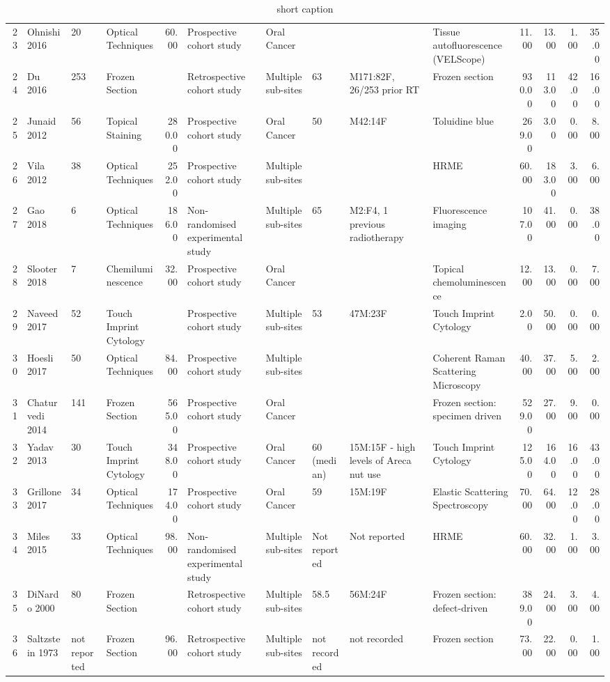 \begin{table}[ht]
\begin{tabular}{rlllrlllllrrrr}
  23 & Ohnishi 2016 & 20 & Optical Techniques & 60.00 & Prospective cohort study & Oral Cancer &  &  & Tissue autofluorescence (VELScope) & 11.00 & 13.00 & 1.00 & 35.00 \\ 
  24 & Du 2016 & 253 & Frozen Section &  & Retrospective cohort study & Multiple sub-sites & 63 & M171:82F, 26/253 prior RT & Frozen section & 930.00 & 113.00 & 42.00 & 16.00 \\ 
  25 & Junaid 2012 & 56 & Topical Staining & 280.00 & Prospective cohort study & Oral Cancer & 50 & M42:14F & Toluidine blue & 269.00 & 3.00 & 0.00 & 8.00 \\ 
  26 & Vila 2012 & 38 & Optical Techniques & 252.00 & Prospective cohort study & Multiple sub-sites &  &  & HRME & 60.00 & 183.00 & 3.00 & 6.00 \\ 
  27 & Gao 2018 & 6 & Optical Techniques & 186.00 & Non-randomised experimental study & Multiple sub-sites & 65 & M2:F4, 1 previous radiotherapy & Fluorescence imaging & 107.00 & 41.00 & 0.00 & 38.00 \\ 
  28 & Slooter 2018 & 7 & Chemiluminescence & 32.00 & Prospective cohort study & Oral Cancer &  &  & Topical chemoluminescence & 12.00 & 13.00 & 0.00 & 7.00 \\ 
  29 & Naveed 2017 & 52 & Touch Imprint Cytology &  & Prospective cohort study & Multiple sub-sites & 53 & 47M:23F & Touch Imprint Cytology & 2.00 & 50.00 & 0.00 & 0.00 \\ 
  30 & Hoesli 2017 & 50 & Optical Techniques & 84.00 & Prospective cohort study & Multiple sub-sites &  &  & Coherent Raman Scattering Microscopy & 40.00 & 37.00 & 5.00 & 2.00 \\ 
  31 & Chaturvedi 2014 & 141 & Frozen Section & 565.00 & Prospective cohort study & Oral Cancer &  &  & Frozen section: specimen driven & 529.00 & 27.00 & 9.00 & 0.00 \\ 
  32 & Yadav 2013 & 30 & Touch Imprint Cytology & 348.00 & Prospective cohort study & Oral Cancer & 60 (median) & 15M:15F - high levels of Areca nut use & Touch Imprint Cytology & 125.00 & 164.00 & 16.00 & 43.00 \\ 
  33 & Grillone 2017 & 34 & Optical Techniques & 174.00 & Prospective cohort study & Oral Cancer & 59 & 15M:19F & Elastic Scattering Spectroscopy & 70.00 & 64.00 & 12.00 & 28.00 \\ 
  34 & Miles 2015 & 33 & Optical Techniques & 98.00 & Non-randomised experimental study & Multiple sub-sites & Not reported & Not reported & HRME & 60.00 & 32.00 & 1.00 & 3.00 \\ 
  35 & DiNardo 2000 & 80 & Frozen Section &  & Retrospective cohort study & Multiple sub-sites & 58.5 & 56M:24F & Frozen section: defect-driven & 389.00 & 24.00 & 3.00 & 4.00 \\ 
  36 & Saltzstein 1973 & not reported & Frozen Section & 96.00 & Retrospective cohort study & Multiple sub-sites & not recorded & not recorded & Frozen section & 73.00 & 22.00 & 0.00 & 1.00 \\ 
   \hline
\end{tabular}
\endgroup
\caption[full caption]{short caption} 
\label{tab:study_details}
\end{table}
